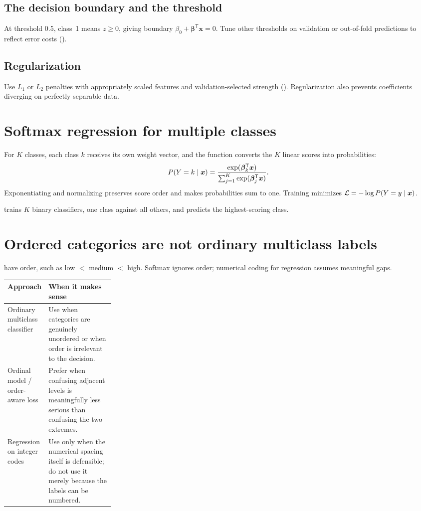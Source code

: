 \subsection{The decision boundary and the threshold}

At threshold $0.5$, class~1 means $z\ge0$, giving boundary $\beta_0+\bm{\beta}^{\mathsf T}\bm{x}=0$. Tune other thresholds on validation or out-of-fold predictions to reflect error costs ().

\subsection{Regularization}

Use $L_1$ or $L_2$ penalties with appropriately scaled features and validation-selected strength (). Regularization also prevents coefficients diverging on perfectly separable data.

\section{Softmax regression for multiple classes}

For $K$ classes, each class $k$ receives its own weight vector, and the  function converts the $K$ linear scores into probabilities:
\[
  P(Y=k\mathrel{|}\bm{x})
  =\frac{\exp(\bm{\beta}_k^{\mathsf T}\bm{x})}
        {\sum_{j=1}^{K}\exp(\bm{\beta}_j^{\mathsf T}\bm{x})}.
\]
Exponentiating and normalizing preserves score order and makes probabilities sum to one. Training minimizes $\mathcal{L}=-\log P(Y=y\mathrel{|}\bm{x})$.

 trains $K$ binary classifiers, one class against all others, and predicts the highest-scoring class.

\section{Ordered categories are not ordinary multiclass labels}
\label{sec:ordinal-labels}

 have order, such as low $<$ medium $<$ high. Softmax ignores order; numerical coding for regression assumes meaningful gaps.

\begin{mltable}
\begin{tabularx}{\linewidth}{@{}p{0.25\linewidth}X@{}}
\toprule
\rowcolor{MLPaleBlue!92}
Approach & When it makes sense \\
\midrule
Ordinary multiclass classifier & Use when categories are genuinely unordered or when order is irrelevant to the decision. \\
Ordinal model / order-aware loss & Prefer when confusing adjacent levels is meaningfully less serious than confusing the two extremes. \\
Regression on integer codes & Use only when the numerical spacing itself is defensible; do not use it merely because the labels can be numbered. \\
\bottomrule
\end{tabularx}
\end{mltable}

